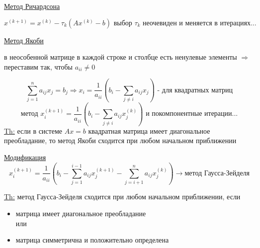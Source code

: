 \underline{Метод Ричардсона}

\[x^{(k+1)}=x^{(k)}-\tau_k(Ax^{(k)}-b) \text{ выбор }\tau_k\text{ неочевиден и меняется в итерациях...}\]



\underline{Метод Якоби}

в неособенной матрице в каждой строке и столбце есть ненулевые элементы \(\Rightarrow\) переставим так, чтобы \(a_{ii} \neq 0\) 

\[\sum_{j=1}^n a_{ij} x_j=b_j \Rightarrow x_i=\frac{1}{a_{ii}}(b_i-\sum_{j \neq i} a_{ij}x_j) \text{ - для квадратных матриц}\]
\[\text{метод } x_i^{(k+1)}=\frac{1}{a_{ii}}(b_i-\sum_{j \neq i} a_{ij}x_j^{(k)}) \text{ и покомпонентные итерации...}\]
\underline{Th:} если в системе \(Ax=b\) квадратная матрица имеет диагональное преобладание, то метод Якоби сходится при любом начальном приближении

\underline{Модификация} \[x_i^{(k+1)}=\frac{1}{a_{ii}}(b_i-\sum_{j=1}^{i-1} a_{ij}x_j^{(k+1)}-\sum_{j=i+1}^n a_{ij} x_j^{(k)}) \rightarrow \text{метод Гаусса-Зейделя}\]



\vspace{5mm}
\underline{Th:} метод Гаусса-Зейделя сходится при любом начальном приближении, если
\begin{itemize}
    \item матрица имеет диагональное преобладание
    \vspace{5mm}\\
    или
    \vspace{1mm}
    \item матрица симметрична и положительно определена
\end{itemize}
